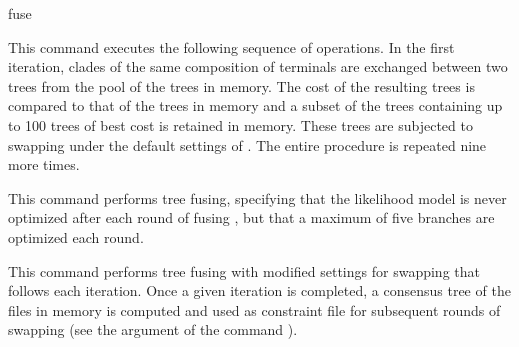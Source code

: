 \begin{command}{fuse}{}
\begin{poyexamples}
            {This command executes the following sequence of operations. In the
            first iteration, clades of the same composition of terminals are exchanged
            between two trees from the pool of the trees in memory. The cost of the
            resulting trees is compared to that of the trees in memory and a subset of
            the trees containing up to 100 trees of best cost is retained in memory.
            These trees are subjected to swapping under the default settings of
            . The entire procedure is repeated nine more times.}
            
            {This command performs tree fusing, specifying that the likelihood model is never optimized 
            after each round of fusing , but that a maximum of five branches are optimized
            each round.}
            
            {This command performs tree fusing  
            with modified settings for swapping that follows each iteration. Once
            a given iteration is completed, a consensus tree of the files in memory
            is computed and used as constraint file for subsequent rounds of swapping (see
            the argument  of the command
            ).}    

     \end{poyexamples}
        
        \begin{poyalso}
    \end{poyalso}

\end{command}



